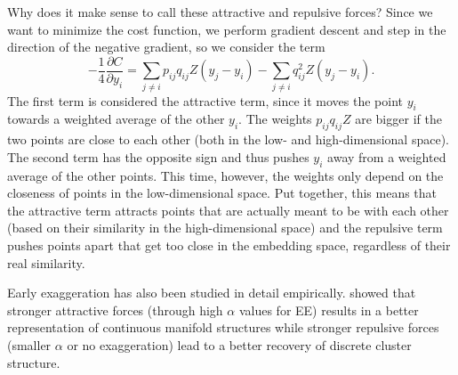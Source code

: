 Why does it make sense to call these attractive and repulsive forces? Since we want to minimize the cost function, we perform gradient descent and step in the direction of the negative gradient, so we consider the term
\begin{equation}
   - \frac{1}{4} \frac{\partial C}{\partial y_i} = \sum_{j \neq i } p_{ij} q_{ij} Z (y_j - y_i) - \sum_{j \neq i} q_{ij}^2 Z (y_j - y_i).  
\end{equation}
The first term is considered the attractive term, since it moves the point $y_i$ towards a weighted average of the other $y_i$. 
The weights $p_{ij} q_{ij} Z$ are bigger if the two points are close to each other (both in the low- and high-dimensional space). 
The second term has the opposite sign and thus pushes $y_i$ away from a weighted average of the other points. This time, however, the weights only depend on the closeness of points in the low-dimensional space. 
Put together, this means that the attractive term attracts points that are actually meant to be with each other (based on their similarity in the high-dimensional space) and the repulsive term pushes points apart that get too close in the embedding space, regardless of their real similarity. 

Early exaggeration has also been studied in detail empirically. \cite{BoehmBerens22} showed that stronger attractive forces (through high $\alpha$ values for EE) results in a better representation of continuous manifold structures while stronger repulsive forces (smaller $\alpha$ or no exaggeration) lead to a better recovery of discrete cluster structure. 